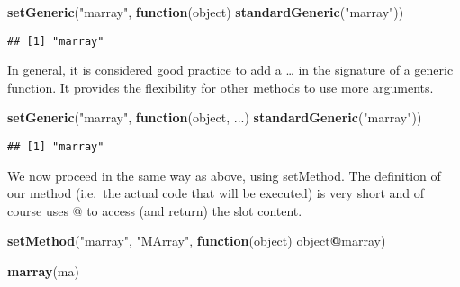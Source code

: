 \documentclass[]{article}
\newenvironment{Shaded}{\begin{snugshade}}{\end{snugshade}}
\newcommand{\ControlFlowTok}[1]{\textcolor[rgb]{0.13,0.29,0.53}{\textbf{#1}}}
\newcommand{\KeywordTok}[1]{\textcolor[rgb]{0.13,0.29,0.53}{\textbf{#1}}}
\newcommand{\NormalTok}[1]{#1}
\newcommand{\OperatorTok}[1]{\textcolor[rgb]{0.81,0.36,0.00}{\textbf{#1}}}
\newcommand{\StringTok}[1]{\textcolor[rgb]{0.31,0.60,0.02}{#1}}
\begin{document}
\begin{Shaded}
\begin{Highlighting}[]
\KeywordTok{setGeneric}\NormalTok{(}\StringTok{"marray"}\NormalTok{, }\ControlFlowTok{function}\NormalTok{(object) }\KeywordTok{standardGeneric}\NormalTok{(}\StringTok{"marray"}\NormalTok{))}
\end{Highlighting}
\end{Shaded}

\begin{verbatim}
## [1] "marray"
\end{verbatim}

In general, it is considered good practice to add a \ldots{} in the
signature of a generic function. It provides the ﬂexibility for other
methods to use more arguments.

\begin{Shaded}
\begin{Highlighting}[]
\KeywordTok{setGeneric}\NormalTok{(}\StringTok{"marray"}\NormalTok{, }\ControlFlowTok{function}\NormalTok{(object, ...) }\KeywordTok{standardGeneric}\NormalTok{(}\StringTok{"marray"}\NormalTok{))}
\end{Highlighting}
\end{Shaded}

\begin{verbatim}
## [1] "marray"
\end{verbatim}

We now proceed in the same way as above, using setMethod. The deﬁnition
of our method (i.e.~the actual code that will be executed) is very short
and of course uses @ to access (and return) the slot content.

\begin{Shaded}
\begin{Highlighting}[]
\KeywordTok{setMethod}\NormalTok{(}\StringTok{"marray"}\NormalTok{, }\StringTok{"MArray"}\NormalTok{, }\ControlFlowTok{function}\NormalTok{(object) object}\OperatorTok{@}\NormalTok{marray)}
\end{Highlighting}
\end{Shaded}

\begin{Shaded}
\begin{Highlighting}[]
\KeywordTok{marray}\NormalTok{(ma)}
\end{Highlighting}
\end{Shaded}
\end{document}
